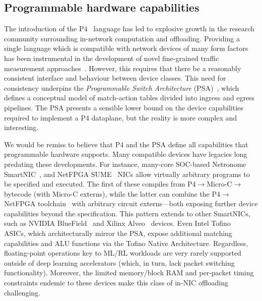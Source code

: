 \documentclass[sigconf,natbib=false]{acmart}
\begin{document}
\subsection{Programmable hardware capabilities}
The introduction of the P4~\parencite{DBLP:journals/ccr/BosshartDGIMRSTVVW14} language has led to explosive growth in the research community surrounding in-network computation and offloading.
Providing a single language which is compatible with network devices of many form factors has been instrumental in the development of novel fine-grained traffic measurement approaches~\parencite{DBLP:conf/sigcomm/GuptaHCFRW18,DBLP:conf/sigcomm/ChenFKRR18,DBLP:conf/sosr/GhasemiBR17}.
However, this requires that there be a reasonably consistent interface and behaviour between device classes.
This need for consistency underpins the \emph{Programmable Switch Architecture} (PSA)~\parencite{p4-psa}, which defines a conceptual model of match-action tables divided into ingress and egress pipelines.
The PSA presents a sensible lower bound on the device capabilities required to implement a P4 dataplane, but the reality is more complex and interesting.

We would be remiss to believe that P4 and the PSA define all capabilities that programmable hardware supports.
Many compatible devices have legacies long predating these developments. 
For instance, many-core SOC-based Netronome SmartNIC~\parencite{netronome-smartnic}, and NetFPGA SUME~\parencite{DBLP:journals/micro/ZilbermanACM14} NICs allow virtually arbitrary programs to be specified and executed.
The first of these compiles from P4$\rightarrow$Micro-C$\rightarrow$bytecode (with Micro-C externs), while the latter can combine the P4$\rightarrow$NetFPGA toolchain~\parencite{DBLP:conf/fpga/IbanezBMZ19} with arbitrary circuit externs---both exposing further device capabilities beyond the specification.
This pattern extends to other SmartNICs, such as NVIDIA BlueField~\parencite{nvidia-bluefield} and Xilinx Alveo~\parencite{xilinx-alveo} devices.
Even Intel Tofino~\parencite{barefoot-intel} ASICs, which architecturally mirror the PSA, expose additional matching capabilities and ALU functions via the Tofino Native Architecture.
Regardless, floating-point operations key to ML/RL workloads are very rarely supported outside of deep learning accelerators (which, in turn, lack packet switching functionality).
Moreover, the limited memory/block RAM and per-packet timing constraints endemic to these devices make this class of in-NIC offloading challenging.
\end{document}

